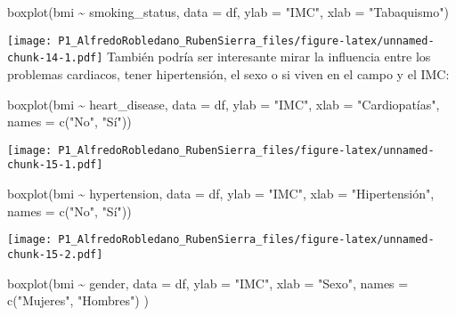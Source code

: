 \documentclass[
]{article}
\newenvironment{Shaded}{\begin{snugshade}}{\end{snugshade}}
\newcommand{\AttributeTok}[1]{\textcolor[rgb]{0.77,0.63,0.00}{#1}}
\newcommand{\FunctionTok}[1]{\textcolor[rgb]{0.00,0.00,0.00}{#1}}
\newcommand{\NormalTok}[1]{#1}
\newcommand{\SpecialCharTok}[1]{\textcolor[rgb]{0.00,0.00,0.00}{#1}}
\newcommand{\StringTok}[1]{\textcolor[rgb]{0.31,0.60,0.02}{#1}}
\begin{document}
\begin{Shaded}
\begin{Highlighting}[]
\FunctionTok{boxplot}\NormalTok{(bmi }\SpecialCharTok{\textasciitilde{}}\NormalTok{ smoking\_status, }\AttributeTok{data =}\NormalTok{ df, }\AttributeTok{ylab =} \StringTok{"IMC"}\NormalTok{, }\AttributeTok{xlab =} \StringTok{"Tabaquismo"}\NormalTok{)}
\end{Highlighting}
\end{Shaded}

\texttt{[image: P1\_AlfredoRobledano\_RubenSierra\_files/figure-latex/unnamed-chunk-14-1.pdf]}
También podría ser interesante mirar la influencia entre los problemas
cardiacos, tener hipertensión, el sexo o si viven en el campo y el IMC:

\begin{Shaded}
\begin{Highlighting}[]
\FunctionTok{boxplot}\NormalTok{(bmi }\SpecialCharTok{\textasciitilde{}}\NormalTok{ heart\_disease, }\AttributeTok{data =}\NormalTok{ df, }\AttributeTok{ylab =} \StringTok{"IMC"}\NormalTok{, }\AttributeTok{xlab =} \StringTok{"Cardiopatías"}\NormalTok{, }\AttributeTok{names =} \FunctionTok{c}\NormalTok{(}\StringTok{"No"}\NormalTok{, }\StringTok{"Sí"}\NormalTok{))}
\end{Highlighting}
\end{Shaded}

\texttt{[image: P1\_AlfredoRobledano\_RubenSierra\_files/figure-latex/unnamed-chunk-15-1.pdf]}

\begin{Shaded}
\begin{Highlighting}[]
\FunctionTok{boxplot}\NormalTok{(bmi }\SpecialCharTok{\textasciitilde{}}\NormalTok{ hypertension, }\AttributeTok{data =}\NormalTok{ df, }\AttributeTok{ylab =} \StringTok{"IMC"}\NormalTok{, }\AttributeTok{xlab =} \StringTok{"Hipertensión"}\NormalTok{, }\AttributeTok{names =} \FunctionTok{c}\NormalTok{(}\StringTok{"No"}\NormalTok{, }\StringTok{"Sí"}\NormalTok{))}
\end{Highlighting}
\end{Shaded}

\texttt{[image: P1\_AlfredoRobledano\_RubenSierra\_files/figure-latex/unnamed-chunk-15-2.pdf]}

\begin{Shaded}
\begin{Highlighting}[]
\FunctionTok{boxplot}\NormalTok{(bmi  }\SpecialCharTok{\textasciitilde{}}\NormalTok{  gender, }\AttributeTok{data =}\NormalTok{ df, }\AttributeTok{ylab =} \StringTok{"IMC"}\NormalTok{, }\AttributeTok{xlab =} \StringTok{"Sexo"}\NormalTok{, }\AttributeTok{names =} \FunctionTok{c}\NormalTok{(}\StringTok{"Mujeres"}\NormalTok{, }\StringTok{"Hombres"}\NormalTok{) )}
\end{Highlighting}
\end{Shaded}
\end{document}
